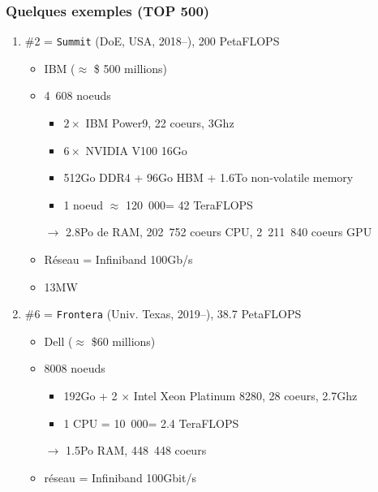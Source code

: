 \documentclass[xcolor={x11names,svgnames}]{beamer}
\newcommand{\euro}{\EUR\xspace}
\begin{document}

\begin{frame}
  \frametitle{Quelques exemples (TOP 500)}

  \begin{enumerate}
  \item \#2 = \texttt{Summit} (DoE, USA, 2018--), 200 PetaFLOPS
    \begin{itemize}
    \item IBM  ($\approx$ \$ 500 millions)
    \item 4~608 noeuds
      \begin{itemize}
      \item $2 \times$ IBM Power9, 22 coeurs, 3Ghz
      \item $6 \times$ NVIDIA V100 16Go
      \item 512Go DDR4 + 96Go HBM + 1.6To non-volatile memory
      \item 1 noeud $\approx$ 120~000\euro = 42 TeraFLOPS
      \end{itemize}
    \item[$\rightarrow$] 2.8Po de RAM, 202~752 coeurs CPU, 2~211~840 coeurs GPU
    \item Réseau = Infiniband 100Gb/s
    \item 13MW 
    \end{itemize}

    \medskip\pause

  \item \#6 = \texttt{Frontera} (Univ. Texas, 2019--), 38.7 PetaFLOPS
    \begin{itemize}
    \item Dell ($\approx$ \$60 millions)
    \item 8008 noeuds
      \begin{itemize}
        \item 192Go + 2 $\times$ Intel Xeon Platinum 8280, 28 coeurs, 2.7Ghz
        \item 1 CPU = 10~000\euro = 2.4 TeraFLOPS
        \end{itemize}
      \item[$\rightarrow$] 1.5Po RAM, 448~448 coeurs
    \item réseau = Infiniband 100Gbit/s
    \end{itemize}
  \end{enumerate}
\end{frame}

\end{document}
